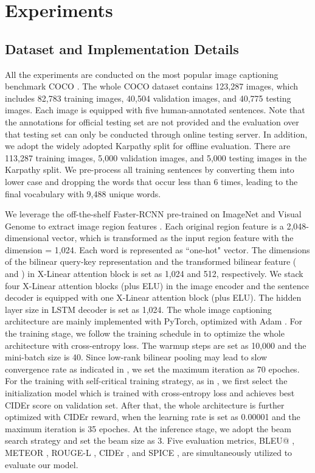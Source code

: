 \documentclass[10pt,twocolumn,letterpaper]{article}
\begin{document}
\section{Experiments}

\subsection{Dataset and Implementation Details}

All the experiments are conducted on the most popular image captioning benchmark COCO \cite{Lin:ECCV14}. The whole COCO dataset contains 123,287 images, which includes 82,783 training images, 40,504 validation images, and 40,775 testing images. Each image is equipped with five human-annotated sentences. Note that the annotations for official testing set are not provided and the evaluation over that testing set can only be conducted through online testing server. In addition, we adopt the widely adopted Karpathy split \cite{Karpathy:CVPR15} for offline evaluation. There are 113,287 training images, 5,000 validation images, and 5,000 testing images in the Karpathy split. We pre-process all training sentences by converting them into lower case and dropping the words that occur less than 6 times, leading to the final vocabulary with 9,488 unique words.

We leverage the off-the-shelf Faster-RCNN pre-trained on ImageNet \cite{ImageNet} and Visual Genome \cite{krishna2017visual} to extract image region features \cite{anderson2017bottom}. Each original region feature is a 2,048-dimensional vector, which is transformed as the input region feature with the dimension  = 1,024. Each word is represented as ``one-hot" vector. The dimensions of the bilinear query-key representation and the transformed bilinear feature ( and ) in X-Linear attention block is set as 1,024 and 512, respectively. We stack four X-Linear attention blocks (plus ELU) in the image encoder and the sentence decoder is equipped with one X-Linear attention block (plus ELU). The hidden layer size in LSTM decoder is set as 1,024. The whole image captioning architecture are mainly implemented with PyTorch, optimized with Adam \cite{kingma2014adam}.
For the training stage, we follow the training schedule in \cite{vaswani2017attention} to optimize the whole architecture with cross-entropy loss. The warmup steps are set as 10,000 and the mini-batch size is 40. Since low-rank bilinear pooling may lead to slow convergence rate as indicated in \cite{kim2016hadamard}, we set the maximum iteration as 70 epoches. For the training with self-critical training strategy, as in \cite{rennie2017self}, we first select the initialization model which is trained with cross-entropy loss and achieves best CIDEr score on validation set. After that, the whole architecture is further optimized with CIDEr reward, when the learning rate is set as 0.00001 and the maximum iteration is 35 epoches. At the inference stage, we adopt the beam search strategy and set the beam size as 3.
Five evaluation metrics, BLEU@ \cite{Papineni:ACL02}, METEOR \cite{Banerjee:ACL05}, ROUGE-L \cite{lin2004rouge}, CIDEr \cite{vedantam2015cider}, and SPICE \cite{spice2016}, are simultaneously utilized to evaluate our model.
\end{document}
